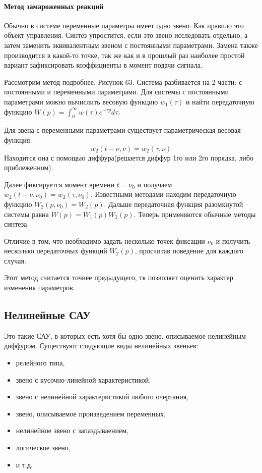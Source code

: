 \paragraph{Метод замароженных реакций}
Обычно в системе переменные параметры имеет одно звено. Как правило это объект управления. Синтез упростится, если это звено исследовать отдельно, а затем заменить эквивалентным звеном с постоянными параметрами. Замена также производится в какой-то точке, так же как и в прошлый раз наиболее простой вариант зафиксировать коэффициенты в момент подачи сигнала.

Рассмотрим метод подробнее. Рисунок 63. Система разбивается на 2 части: с постоянными и переменными параметрами. Для системы с постоянными параметрами можно вычислить весовую функцию $w_1(\tau)$ и найти передаточную функцию $W(p)=\int^{\infty}_0w(\tau)e^{-\tau{}p}d\tau$. 

Для звена с переменными параметрами существует параметрическая весовая функция:
$$
	w_2(t-\nu,\nu)=w_2(\tau,\nu)
$$
Находится она с помощью диффура(решается диффур 1го или 2го порядка, либо приблеженном).

Далее фиксируется момент времени $t=\nu_0$ и получаем $w_2(t-\nu,\nu_0)=w_2(\tau,\nu_0)$. Известными методами находим передаточную функцию $W_2(p,\nu_0)=W_2(p)$. Дальше передаточная функция разомкнутой системы равна $W(p)=W_1(p)W_2(p)$. Теперь применяются обычные методы синтеза. 

Отличие в том, что необходимо задать несколько точек фиксации $\nu_0$ и получить несколько передаточных функций $W_2(p)$, просчитав поведение для каждого случая.

Этот метод считается точнее предыдущего, тк позволяет оценить характер изменения параметров.

\subsection{Нелинейные САУ}
Это такие САУ, в которых есть хотя бы одно звено, описываемое нелинейным диффуром. Существуют следующие виды нелинейных звеньев:
\begin{itemize}
\item релейного типа,
\item звено с кусочно-линейной характеристикой,
\item звено с нелинейной характеристикой любого очертания,
\item звено, описываемое произведением переменных,
\item нелинейное звено с запаздываением,
\item логическое звено,
\item и т.д.
\end{itemize}

